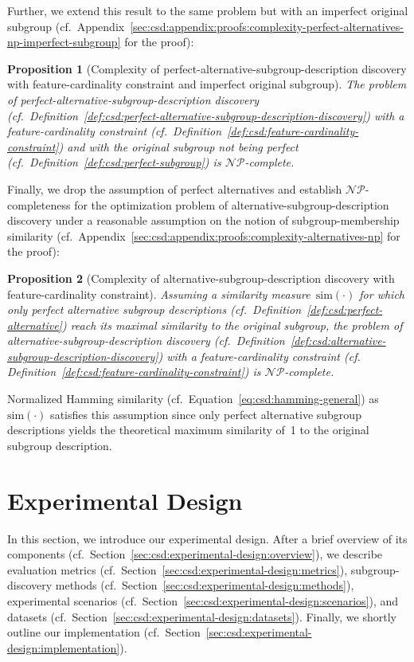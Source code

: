 \documentclass{article}
\newtheorem{proposition}{Proposition}
\theoremstyle{definition}
\begin{document}
%
Further, we extend this result to the same problem but with an imperfect original subgroup (cf.~Appendix~\ref{sec:csd:appendix:proofs:complexity-perfect-alternatives-np-imperfect-subgroup} for the proof):
%
\begin{proposition}[Complexity of perfect-alternative-subgroup-description discovery with feature-cardinality constraint and imperfect original subgroup]
	The problem of perfect-alternative-subgroup-description discovery (cf.~Definition~\ref{def:csd:perfect-alternative-subgroup-description-discovery}) with a feature-cardinality constraint (cf.~Definition~\ref{def:csd:feature-cardinality-constraint}) and with the original subgroup \emph{not} being perfect (cf.~Definition~\ref{def:csd:perfect-subgroup}) is $\mathcal{NP}$-complete.
	\label{prop:csd:complexity-perfect-alternatives-np-imperfect-subgroup}
\end{proposition}
%
Finally, we drop the assumption of perfect alternatives and establish $\mathcal{NP}$-completeness for the optimization problem of alternative-subgroup-description discovery under a reasonable assumption on the notion of subgroup-membership similarity (cf.~Appendix~\ref{sec:csd:appendix:proofs:complexity-alternatives-np} for the proof):
%
\begin{proposition}[Complexity of alternative-subgroup-description discovery with feature-cardinality constraint]
	Assuming a similarity measure~$\text{sim}(\cdot)$ for which only perfect alternative subgroup descriptions (cf.~Definition~\ref{def:csd:perfect-alternative}) reach its maximal similarity to the original subgroup,
	the problem of alternative-subgroup-description discovery (cf.~Definition~\ref{def:csd:alternative-subgroup-description-discovery}) with a feature-cardinality constraint (cf. Definition~\ref{def:csd:feature-cardinality-constraint}) is $\mathcal{NP}$-complete.
	\label{prop:csd:complexity-alternatives-np}
\end{proposition}
%
Normalized Hamming similarity (cf.~Equation~\ref{eq:csd:hamming-general}) as~$\text{sim}(\cdot)$ satisfies this assumption since only perfect alternative subgroup descriptions yields the theoretical maximum similarity of~1 to the original subgroup description.

\section{Experimental Design}
\label{sec:csd:experimental-design}

In this section, we introduce our experimental design.
After a brief overview of its components (cf.~Section~\ref{sec:csd:experimental-design:overview}), we describe evaluation metrics (cf.~Section~\ref{sec:csd:experimental-design:metrics}), subgroup-discovery methods (cf.~Section~\ref{sec:csd:experimental-design:methods}), experimental scenarios (cf.~Section~\ref{sec:csd:experimental-design:scenarios}), and datasets (cf.~Section~\ref{sec:csd:experimental-design:datasets}).
Finally, we shortly outline our implementation (cf.~Section~\ref{sec:csd:experimental-design:implementation}).
\end{document}

